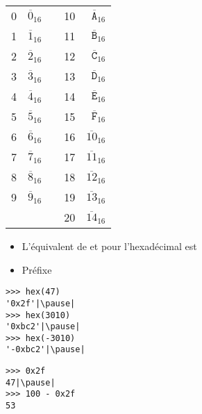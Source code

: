 \begin{frame}

  \bigskip
  
  \begin{center}
    \begin{tabular}[ht]{rrp{2cm}rr}
      0 & $\overline{0}_{16}$ & &10 & $\overline{\mathtt{A}}_{16}$\\
      1 & $\overline{1}_{16}$ & &11 & $\overline{\mathtt{B}}_{16}$\\
      2 & $\overline{2}_{16}$ & &12 & $\overline{\mathtt{C}}_{16}$\\
      3 & $\overline{3}_{16}$ & &13 & $\overline{\mathtt{D}}_{16}$\\
      4 & $\overline{4}_{16}$ & &14 & $\overline{\mathtt{E}}_{16}$\\
      5 & $\overline{5}_{16}$ & &15 & $\overline{\mathtt{F}}_{16}$\\
      6 & $\overline{6}_{16}$ & &16 & $\overline{10}_{16}$\\
      7 & $\overline{7}_{16}$ & &17 & $\overline{11}_{16}$\\
      8 & $\overline{8}_{16}$ & &18 & $\overline{12}_{16}$\\
      9 & $\overline{9}_{16}$ & &19 & $\overline{13}_{16}$\\
      &  & &20 & $\overline{14}_{16}$\\
    \end{tabular}
  \end{center}
\end{frame}


\begin{frame}[fragile]



\begin{itemize}
  \pause
  \item L'équivalent de  et  pour l'hexadécimal est 
    \pause
  \item Préfixe 
\end{itemize}
  
 \pause 
\begin{lstlisting}
>>> hex(47)
'0x2f'|\pause|
>>> hex(3010)
'0xbc2'|\pause|
>>> hex(-3010)
'-0xbc2'|\pause|  
\end{lstlisting}

\begin{lstlisting}
>>> 0x2f
47|\pause|
>>> 100 - 0x2f
53
\end{lstlisting}


\end{frame}

